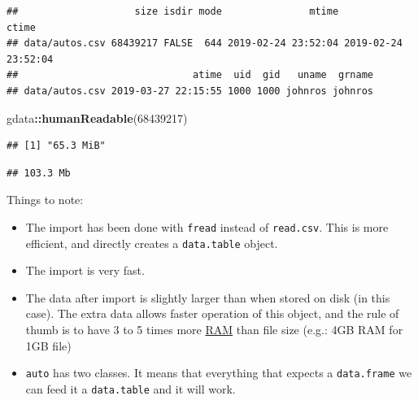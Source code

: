 \documentclass[]{book}
\newenvironment{Shaded}{\begin{snugshade}}{\end{snugshade}}
\newcommand{\KeywordTok}[1]{\textcolor[rgb]{0.13,0.29,0.53}{\textbf{#1}}}
\newcommand{\DataTypeTok}[1]{\textcolor[rgb]{0.13,0.29,0.53}{#1}}
\newcommand{\DecValTok}[1]{\textcolor[rgb]{0.00,0.00,0.81}{#1}}
\newcommand{\StringTok}[1]{\textcolor[rgb]{0.31,0.60,0.02}{#1}}
\newcommand{\CommentTok}[1]{\textcolor[rgb]{0.56,0.35,0.01}{\textit{#1}}}
\newcommand{\OperatorTok}[1]{\textcolor[rgb]{0.81,0.36,0.00}{\textbf{#1}}}
\newcommand{\NormalTok}[1]{#1}
\providecommand{\tightlist}{%
  \setlength{\itemsep}{0pt}\setlength{\parskip}{0pt}}
\theoremstyle{definition}
\theoremstyle{definition}
\theoremstyle{definition}
\theoremstyle{remark}
\begin{document}
\begin{verbatim}
##                    size isdir mode               mtime               ctime
## data/autos.csv 68439217 FALSE  644 2019-02-24 23:52:04 2019-02-24 23:52:04
##                              atime  uid  gid   uname  grname
## data/autos.csv 2019-03-27 22:15:55 1000 1000 johnros johnros
\end{verbatim}

\begin{Shaded}
\begin{Highlighting}[]
\NormalTok{gdata}\OperatorTok{::}\KeywordTok{humanReadable}\NormalTok{(}\DecValTok{68439217}\NormalTok{)}
\end{Highlighting}
\end{Shaded}

\begin{verbatim}
## [1] "65.3 MiB"
\end{verbatim}

\begin{Shaded}
\end{Shaded}

\begin{verbatim}
## 103.3 Mb
\end{verbatim}

Things to note:

\begin{itemize}
\tightlist
\item
  The import has been done with \texttt{fread} instead of
  \texttt{read.csv}. This is more efficient, and directly creates a
  \texttt{data.table} object.
\item
  The import is very fast.
\item
  The data after import is slightly larger than when stored on disk (in
  this case). The extra data allows faster operation of this object, and
  the rule of thumb is to have 3 to 5 times more
  \href{https://en.wikipedia.org/wiki/Random-access_memory}{RAM} than
  file size (e.g.: 4GB RAM for 1GB file)
\item
  \texttt{auto} has two classes. It means that everything that expects a
  \texttt{data.frame} we can feed it a \texttt{data.table} and it will
  work.
\end{itemize}
\end{document}
